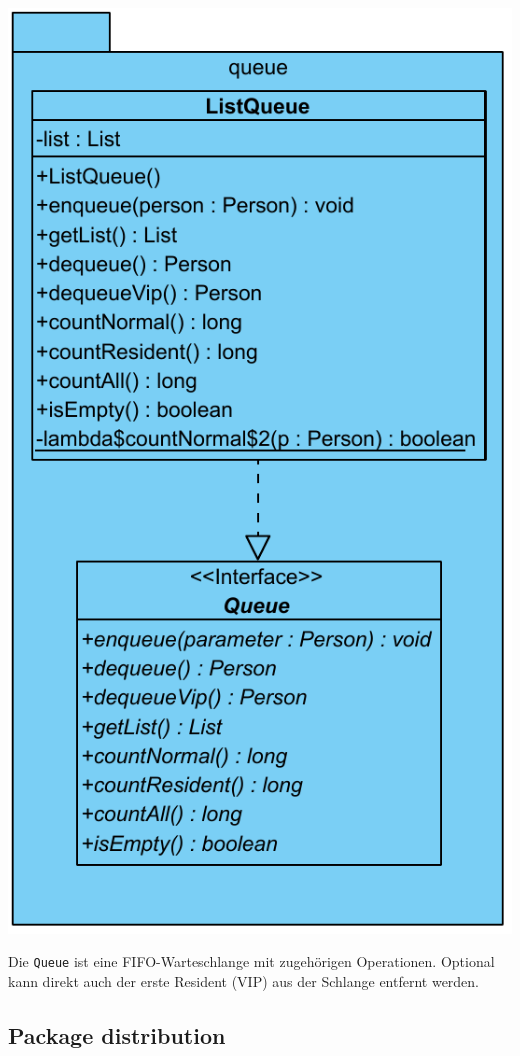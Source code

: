 \includegraphics[scale=0.5]{abbildungen/uml/queue.pdf}

Die \texttt{Queue} ist eine FIFO-Warteschlange mit zugehörigen Operationen. Optional kann direkt auch der erste Resident (VIP) aus der Schlange entfernt werden. 

\subsection{Package distribution}

